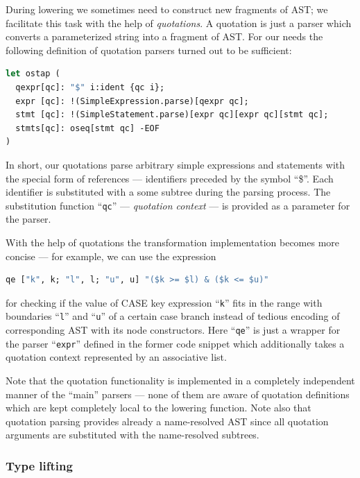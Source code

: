 During lowering we sometimes need to construct new fragments of AST; we facilitate this task
with the help of \emph{quotations}. A quotation is just a parser which converts a parameterized 
string into a fragment of AST. For our needs the following definition of quotation parsers turned out 
to be sufficient:

\begin{lstlisting}[language=ocaml]
let ostap (
  qexpr[qc]: "$" i:ident {qc i};
  expr [qc]: !(SimpleExpression.parse)[qexpr qc];
  stmt [qc]: !(SimpleStatement.parse)[expr qc][expr qc][stmt qc];
  stmts[qc]: oseq[stmt qc] -EOF
)
\end{lstlisting}

In short, our quotations parse arbitrary simple expressions and statements with the special form of
references --- identifiers preceded by the symbol ``\$''. Each identifier is substituted with a
some subtree during the parsing process. The substitution function ``\lstinline{qc}'' --- 
\emph{quotation context} --- is provided as a parameter for the parser. 

With the help of quotations the transformation implementation becomes more concise --- for example, 
we can use the expression

\begin{lstlisting}[language=ocaml]
   qe ["k", k; "l", l; "u", u] "($k >= $l) & ($k <= $u)"
\end{lstlisting}

for checking if the value of CASE key expression ``\lstinline{k}'' fits in the range with boundaries
``\lstinline{l}'' and ``\lstinline{u}'' of a certain case branch instead of tedious encoding of corresponding 
AST with its node constructors. Here ``\lstinline{qe}'' is just a wrapper for the parser ``\lstinline{expr}''
defined in the former code snippet which additionally takes a quotation context represented by an associative 
list.

Note that the quotation functionality is implemented in a completely independent manner of the ``main'' parsers ---
none of them are aware of quotation definitions which are kept completely local to the lowering function. Note also
that quotation parsing provides already a name-resolved AST since all quotation arguments are substituted with 
the name-resolved subtrees.

\subsubsection{Type lifting}

